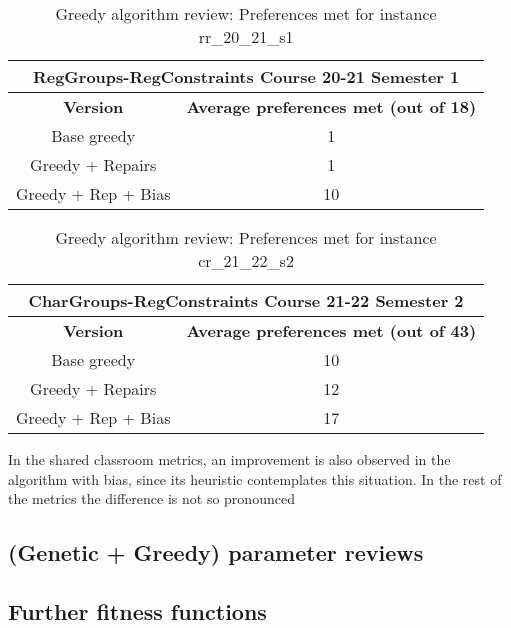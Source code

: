 \begin{table}[H]
    \centering
    \caption{Greedy algorithm review: Preferences met for instance rr\_20\_21\_s1}
    \label{table-prefs-01}
    \begin{tabular}{|c|c|}
        \hline
        \multicolumn{2}{|c|}{\textbf{RegGroups-RegConstraints Course 20-21 Semester 1}} \\
        \hline
        \textbf{Version} & \textbf{Average preferences met (out of 18)} \\
        \hline
        \rowcolor{blue!30}
        Base greedy & 1 \\
        \rowcolor{blue!10}
        Greedy + Repairs & 1 \\
        \rowcolor{blue!30}
        Greedy + Rep + Bias & 10 \\
        \hline
    \end{tabular}
\end{table}


\begin{table}[H]
    \centering
    \caption{Greedy algorithm review: Preferences met for instance cr\_21\_22\_s2}
    \label{table-prefs-02}
    \begin{tabular}{|c|c|}
        \hline
        \multicolumn{2}{|c|}{\textbf{CharGroups-RegConstraints Course 21-22 Semester 2}} \\
        \hline
        \textbf{Version} & \textbf{Average preferences met (out of 43)} \\
        \hline
        \rowcolor{blue!30}
        Base greedy & 10 \\
        \rowcolor{blue!10}
        Greedy + Repairs & 12 \\
        \rowcolor{blue!30}
        Greedy + Rep + Bias & 17 \\
        \hline
    \end{tabular}
\end{table}

In the shared classroom metrics, an improvement is also observed in the algorithm with bias, since its heuristic contemplates this situation. In the rest of the metrics the difference is not so pronounced


\subsection{(Genetic + Greedy) parameter reviews}

\subsection{Further fitness functions}

